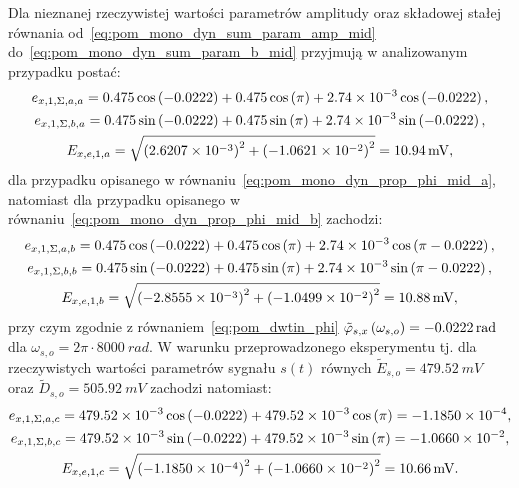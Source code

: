 Dla nieznanej rzeczywistej wartości parametrów amplitudy oraz składowej stałej równania od~\eqref{eq:pom_mono_dyn_sum_param_amp_mid} do~\eqref{eq:pom_mono_dyn_sum_param_b_mid} przyjmują w analizowanym przypadku postać:
\begin{gather}
e_{x,1,\Sigma,a,a} = 0.475 \cos \left(-0.0222\right) + 0.475 \cos \left(\pi\right) + \num{2.74e-3} \cos \left(-0.0222\right) \label{eq:pom_mono_dyn_sum_param_a_mid_val_a}, \\
e_{x,1,\Sigma,b,a} = 0.475 \sin \left(-0.0222\right) + 0.475 \sin \left(\pi\right) + \num{2.74e-3} \sin \left(-0.0222\right) \label{eq:pom_mono_dyn_sum_param_b_mid_val_a}, \\
E_{x,e,1,a} = \sqrt{\left(\num{2.6207e-3}\right)^{2} + \left(\num{-1.0621e-2}\right)^{2}} = \qty{10.94}{mV} \label{eq:pom_mono_dyn_sum_param_amp_mid_val_a},
\end{gather}
dla przypadku opisanego w równaniu~\eqref{eq:pom_mono_dyn_prop_phi_mid_a}, natomiast dla przypadku opisanego w równaniu~\eqref{eq:pom_mono_dyn_prop_phi_mid_b} zachodzi:
\begin{gather}
e_{x,1,\Sigma,a,b} = 0.475 \cos \left(-0.0222\right) + 0.475 \cos \left(\pi\right) + \num{2.74e-3} \cos \left(\pi-0.0222\right) \label{eq:pom_mono_dyn_sum_param_a_mid_val_b}, \\
e_{x,1,\Sigma,b,b} = 0.475 \sin \left(-0.0222\right) + 0.475 \sin \left(\pi\right) + \num{2.74e-3} \sin \left(\pi-0.0222\right) \label{eq:pom_mono_dyn_sum_param_b_mid_val_b}, \\
E_{x,e,1,b} = \sqrt{\left(\num{-2.8555e-3}\right)^{2} + \left(\num{-1.0499e-2}\right)^{2}} = \qty{10.88}{mV} \label{eq:pom_mono_dyn_sum_param_amp_mid_val_b}, 
\end{gather}
przy czym zgodnie z równaniem~\eqref{eq:pom_dwtin_phi} $\tilde{\varphi}_{s,x} \left(\omega_{s,o}\right) = \qty{-0.0222}{rad}$ dla $\omega_{s,o} = 2\pi \cdot \qty{8000}{rad}$. W warunku przeprowadzonego eksperymentu tj. dla rzeczywistych wartości parametrów sygnału $s(t)$ równych $\tilde{E}_{s,o} = \qty{479.52}{mV}$ oraz $\tilde{D}_{s,o} = \qty{505.92}{mV}$ zachodzi natomiast:
\begin{gather}
e_{x,1,\Sigma,a,c} = \qty{479.52e-3} \cos \left(-0.0222\right) + \qty{479.52e-3} \cos \left(\pi\right) = \num{-1.1850e-4} \label{eq:pom_mono_dyn_sum_param_a_mid_val_c}, \\
e_{x,1,\Sigma,b,c} = \qty{479.52e-3} \sin \left(-0.0222\right) + \qty{479.52e-3} \sin \left(\pi\right) = \num{-1.0660e-2} \label{eq:pom_mono_dyn_sum_param_b_mid_val_c}, \\
E_{x,e,1,c} = \sqrt{\left(\num{-1.1850e-4}\right)^{2} + \left(\num{-1.0660e-2}\right)^{2}} = \qty{10.66}{mV} \label{eq:pom_mono_dyn_sum_param_amp_mid_val_c}. 
\end{gather}
